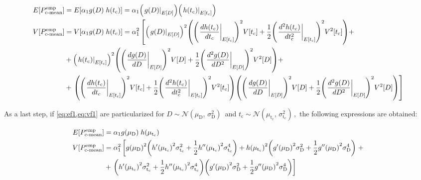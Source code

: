 \documentclass[12pt,number,preprint,review,times]{elsarticle}
\begin{document}
\begin{align}
E[P^{\mathrm{emp}}_{\mathrm{c{\text -}mean}}] &=  E[\alpha_1 g(D) \; h(t_\mathrm{c})] = \alpha_1 {\left( \left.{g(D)}\right|_{E[D]} \right)}  {\left( \left.{h(t_\mathrm{c})}\right|_{E[t_\mathrm{c}]} \right)} \label{eq:ef1}\\
V[P^{\mathrm{emp}}_{\mathrm{c{\text -}mean}}] &=  V[\alpha_1 g(D) \; h(t_\mathrm{c})] =  \alpha_1^2 \left[ {\left( \left.{g(D)}\right|_{E[D]} \right)}^2   {\left( {\left( \left.\frac{d h(t_\mathrm{c})}{d t_\mathrm{c}}\right|_{E[t_\mathrm{c}]} \right)}^2 V[t_\mathrm{c}] + \frac{1}{2} {\left( \left.\frac{d^2 h(t_\mathrm{c})}{d t_\mathrm{c}^2}\right|_{E[t_\mathrm{c}]} \right)}^2 V^2[t_\mathrm{c}] \right)} + \right. \nonumber \\
&+ {\left( \left.{h(t_\mathrm{c})}\right|_{E[t_\mathrm{c}]} \right)}^2   {\left( {\left( \left.\frac{d g(D)}{d D}\right|_{E[D]} \right)}^2 V[D] + \frac{1}{2} {\left( \left.\frac{d^2 g(D)}{d D^2}\right|_{E[D]} \right)}^2 V^2[D] \right)} + \nonumber \\
&+ \left.{\left( {\left( \left.\frac{d h(t_\mathrm{c})}{d t_\mathrm{c}}\right|_{E[t_\mathrm{c}]} \right)}^2 V[t_\mathrm{c}] + \frac{1}{2} {\left( \left.\frac{d^2 h(t_\mathrm{c})}{d t_\mathrm{c}^2}\right|_{E[t_\mathrm{c}]} \right)}^2 V^2[t_\mathrm{c}] \right)}  {\left( {\left( \left.\frac{d g(D)}{d D}\right|_{E[D]} \right)}^2 V[D] + \frac{1}{2} {\left( \left.\frac{d^2 g(D)}{d D^2}\right|_{E[D]} \right)}^2 V^2[D] \right)} \right] \label{eq:vf1}
\end{align}

As a last step, if \cref{eq:ef1,eq:vf1} are particularized for $D \sim \mathcal{N}(\mu_\mathrm{D},\,\sigma_\mathrm{D}^{2})\,$ and $t_\mathrm{c} \sim \mathcal{N}(\mu_\mathrm{t_\mathrm{c}},\,\sigma_\mathrm{t_\mathrm{c}}^{2})\,,$ the following expressions are obtained:

\begin{align}
E[P^{\mathrm{emp}}_{\mathrm{c{\text -}mean}}] &=  \alpha_1 g(\mu_\mathrm{D}) \; h(\mu_\mathrm{t_\mathrm{c}}) \label{eq:ef2}\\
V[P^{\mathrm{emp}}_{\mathrm{c{\text -}mean}}] &=  \alpha_1^2 \left[ { {g(\mu_\mathrm{D})} }^2   {\left( {h'(\mu_\mathrm{t_\mathrm{c}})}^2 \sigma_\mathrm{t_\mathrm{c}}^{2} + \frac{1}{2} {{h''(\mu_\mathrm{t_\mathrm{c}})}^2 \sigma_\mathrm{t_\mathrm{c}}^{4}}  \right)} +  { {h(\mu_\mathrm{t_\mathrm{c}})} }^2   {\left( {g'(\mu_\mathrm{D})}^2 \sigma_\mathrm{D}^{2} + \frac{1}{2} {{g''(\mu_\mathrm{D})}^2 \sigma_\mathrm{D}^{4}}  \right)}   \right. + \nonumber \\
&+ \left.{\left( {h'(\mu_\mathrm{t_\mathrm{c}})}^2 \sigma_\mathrm{t_\mathrm{c}}^{2} + \frac{1}{2} {{h''(\mu_\mathrm{t_\mathrm{c}})}^2 \sigma_\mathrm{t_\mathrm{c}}^{4}}  \right)} {\left( {g'(\mu_\mathrm{D})}^2 \sigma_\mathrm{D}^{2} + \frac{1}{2} {{g''(\mu_\mathrm{D})}^2 \sigma_\mathrm{D}^{4}}  \right)} \right]\label{eq:vf2}
\end{align}
\end{document}
